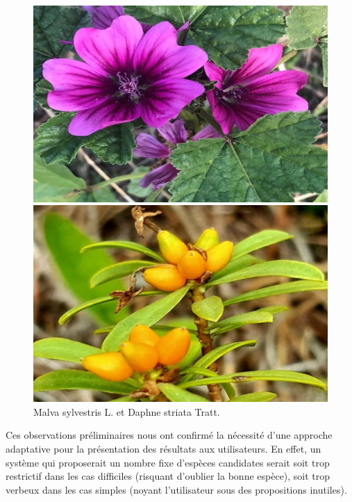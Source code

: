 \documentclass[a4paper,12pt]{article}
\begin{document}
\begin{figure}[H]
    \centering
    \begin{minipage}{0.5\textwidth}
      \includegraphics[width=0.9\linewidth]{images/malva_sylvestris.jpeg}
    \end{minipage}%
    \begin{minipage}{0.5\textwidth}
      \includegraphics[width=0.9\linewidth]{images/daphne_striata.jpeg}
    \end{minipage}
    \caption{Malva sylvestris L. et Daphne striata Tratt.}
    \label{fig:malva}
\end{figure}

Ces observations préliminaires nous ont confirmé la nécessité d'une approche adaptative pour la présentation des résultats aux utilisateurs. En effet, un système qui proposerait un nombre fixe d'espèces candidates serait soit trop restrictif dans les cas difficiles (risquant d'oublier la bonne espèce), soit trop verbeux dans les cas simples (noyant l'utilisateur sous des propositions inutiles).
\end{document}
